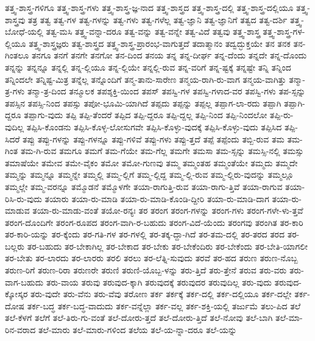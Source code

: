 {ತತ್ತ್ವ-ಶಾಸ್ತ್ರ-ಗಳಿಗೂ
ತತ್ತ್ವ-ಶಾಸ್ತ್ರ-ಗಳು
ತತ್ತ್ವ-ಶಾಸ್ತ್ರ-ಜ್ಞ-ನಾದ
ತತ್ತ್ವ-ಶಾಸ್ತ್ರದ
ತತ್ತ್ವ-ಶಾಸ್ತ್ರ-ದಲ್ಲಿ
ತತ್ತ್ವ-ಶಾಸ್ತ್ರ-ದಲ್ಲಿಯೂ
ತತ್ತ್ವ-ಶಾಸ್ತ್ರವು
ತತ್ರ
ತತ್ವ
ತತ್ವ-ಗಳ
ತತ್ವ-ಗಳನ್ನು
ತತ್ವ-ಗಳು
ತತ್ವ-ಗಳೆಲ್ಲ
ತತ್ವ-ಜ್ಞಾನಿ
ತತ್ವ-ಜ್ಞಾನಿಗೆ
ತತ್ವದ
ತತ್ವ-ದರ್ಶಿ
ತತ್ತ್ವ-ಬೋಧೆ-ಯಲ್ಲಿ
ತತ್ವ-ಮಸಿ
ತತ್ತ್ವ-ವನ್ನಾ-ದರೂ
ತತ್ವ-ವನ್ನು
ತತ್ವ-ವನ್ನೇ
ತತ್ವ-ವಿದೆ
ತತ್ವವು
ತತ್ತ್ವ-ಶಾಸ್ತ್ರ
ತತ್ತ್ವ-ಶಾಸ್ತ್ರ-ಗಳ-ಲ್ಲಿಯೂ
ತತ್ತ್ವ-ಶಾಸ್ತ್ರಜ್ಞರು
ತತ್ವ-ಶಾಸ್ತ್ರದ
ತತ್ತ್ವ-ಶಾಸ್ತ್ರ-ಪ್ರಾರಂಭ-ವಾಗುತ್ತದೆ
ತದಾತ್ಮಾನಂ
ತದ್ವದ್ಭುಕ್ತಯೇ
ತನ
ತನಕ
ತನ-ಗಿಂತಲೂ
ತನಗೂ
ತನಗೆ
ತನಗೇ
ತನಗೋ
ತನ-ದಿಂದ
ತನಯ
ತನ್ನ
ತನ್ನ-ದೀರ್ಘ
ತನ್ನ-ದೆಂದು
ತನ್ನದೇ
ತನ್ನ-ದೊಂದು
ತನ್ನನ್ನು
ತನ್ನನ್ನೂ
ತನ್ನಲ್ಲಿ
ತನ್ನ-ಲ್ಲಿಯೂ
ತನ್ನ-ಲ್ಲಿಯೇ
ತನ್ನಲ್ಲಿ-ರುವ
ತನ್ನ-ವರಿಗೆ
ತನ್ನ-ಷ್ಟಕ್ಕೆ
ತನ್ನಷ್ಟೇ
ತನ್ನಿ
ತನ್ನಿಂದ
ತನ್ನಿಂದಲೇ
ತನ್ನಿಷ್ಟ-ಮಿತ್ರ
ತನ್ನೆಲ್ಲ
ತನ್ನೊಂದಿಗೆ
ತನ್ಮ-ತಾನು-ಸಾರೇಣ
ತನ್ಮಯ-ರಾಗಿ-ರು-ವಾಗ
ತನ್ಮಯ-ವಾಗಿತ್ತು
ತನ್ಮಾ-ತ್ರ-ಗಳು
ತನ್ಮಾ-ತ್ರ-ದಿಂದ
ತನ್ಮೂಲಕ
ತಪಶ್ಶಕ್ತಿ-ಯಿಂದ
ತಪಸ್
ತಪಸ್ವಿ-ಗಳ
ತಪಸ್ವಿ-ಗಳಾದ-ವರ
ತಪಸ್ವಿ-ಗಳು
ತಪ-ಸ್ಸನ್ನು
ತಪಸ್ಸಿನ
ತಪಸ್ಸಿ-ನಿಂದ
ತಪಸ್ಸು
ತಪೋ-ಭೂಮಿ-ಯಾಗಿದೆ
ತಪ್ಪದು
ತಪ್ಪನ್ನು
ತಪ್ಪಲ್ಲ
ತಪ್ಪಾಗ-ಲಾ-ರದು
ತಪ್ಪಾಗಿ
ತಪ್ಪಾಗಿ-ದ್ದರೂ
ತಪ್ಪಾಗು-ವುದು
ತಪ್ಪಿ
ತಪ್ಪಿ-ತೆಂದರೆ
ತಪ್ಪಿದ
ತಪ್ಪಿ-ದ್ದರೂ
ತಪ್ಪಿ-ದ್ದಲ್ಲ
ತಪ್ಪಿ-ನಿಂದ
ತಪ್ಪಿ-ನಿಂದಲೋ
ತಪ್ಪಿ-ರು-ವುದಿಲ್ಲ
ತಪ್ಪಿಸಿ-ಕೊಂಡನು
ತಪ್ಪಿಸಿ-ಕೊಳ್ಳ-ಲೋಸುಗವೇ
ತಪ್ಪಿಸಿ-ಕೊಳ್ಳು-ವುದಕ್ಕೆ
ತಪ್ಪಿಸಿ-ಕೊಳ್ಳು-ವುದು
ತಪ್ಪಿಸಿದ
ತಪ್ಪಿ-ಸಿದರೆ
ತಪ್ಪು
ತಪ್ಪು-ಗಳನ್ನು
ತಪ್ಪು-ಗಳನ್ನೂ
ತಪ್ಪು-ಗಳಿವೆ
ತಪ್ಪು-ಗಳು
ತಪ್ಪು-ತ್ತದೆ
ತಪ್ಪೆ
ತಪ್ಪೆಂದು
ತಬ್ಬಿ-ರುವ
ತಮ
ತಮ-ಗಿಂತ
ತಮ-ಗಿ-ರುವ
ತಮಗೂ
ತಮಗೆ
ತಮ-ಗೆಯೇ
ತಮ-ಗೆಲ್ಲ
ತಮಗೇ
ತಮಸಾ
ತಮ-ಸ್ಸನ್ನು
ತಮಸ್ಸಿ-ನಲ್ಲಿ
ತಮಸ್ಸು
ತಮಾಷೆಯೇ
ತಮೇವ
ತಮೇ-ವೈಕಂ
ತಮೋ
ತಮೋ-ಗುಣವು
ತಮ್ಮ
ತಮ್ಮಂತಹ
ತಮ್ಮಂತೆಯೇ
ತಮ್ಮದು
ತಮ್ಮದೇ
ತಮ್ಮನ್ನು
ತಮ್ಮನ್ನೂ
ತಮ್ಮನ್ನೇ
ತಮ್ಮಲ್ಲಿ
ತಮ್ಮ-ಲ್ಲಿಗೆ
ತಮ್ಮ-ಲ್ಲಿದ್ದ
ತಮ್ಮ-ಲ್ಲಿ-ರುವ
ತಮ್ಮ-ಲ್ಲಿರು-ವುದನ್ನು
ತಮ್ಮಲ್ಲೂ
ತಮ್ಮಲ್ಲೇ
ತಮ್ಮ-ವರನ್ನೂ
ತಮ್ಮೊಡನೆ
ತಮ್ಮೊಳಗೇ
ತಯಾ-ರಾಗುತ್ತಿ-ರುವ
ತಯಾ-ರಾಗು-ತ್ತಿವೆ
ತಯಾ-ರಾಗುವ
ತಯಾ-ರಿಸಿ-ರು-ವುದು
ತಯಾರು
ತಯಾ-ರು-ಮಾಡಿ
ತಯಾ-ರು-ಮಾಡಿ-ಕೊಂಡಿ-ದ್ದೀರಿ
ತಯಾ-ರು-ಮಾಡಿ-ದಾಗ
ತಯಾ-ರು-ಮಾಡುವ
ತಯಾ-ರು-ಮಾಡು-ವಂತೆ
ತಯೋ-ರನ್ಯಃ
ತರ
ತರಂಗ
ತರಂಗ-ಗಳನ್ನು
ತರಂಗ-ಗಳು
ತರಂಗ-ಗಳೇ-ಳು-ತ್ತವೆ
ತರಂಗ-ದೊಂದಿಗೇ
ತರಂಗ-ರೂಪದ
ತರಂಗ-ವಾಗಿ-ರ-ಬಹುದು
ತರಂಗ-ವಿದೆ-ಯೆಂದು
ತರಂಗವು
ತರಂಗಿತ
ತರ-ಕಾರಿ
ತರ-ಕಾರಿ-ಯನ್ನು
ತರ-ಕ್ಕೆಂದು
ತರ-ಗತಿ-ಗಳ
ತರ-ಗಳಲ್ಲಿ
ತರ-ತಕ್ಕ-ದ್ದಾ-ಗಿದೆ
ತರ-ತಮ-ದಲ್ಲಿ
ತರ-ತರದ
ತರದ
ತರ-ಬಲ್ಲರು
ತರ-ಬಹುದು
ತರ-ಬೇಕಾಗಿಲ್ಲ
ತರ-ಬೇಕಾದ
ತರ-ಬೇಕು
ತರ-ಬೇಕೆಂದಿರು
ತರ-ಬೇಕೆಂದು
ತರ-ಬೇತಿ-ಯಾಗಲೀ
ತರ-ಬೇತು
ತರ-ಲಾರದು
ತರ-ಲಾರರು
ತರಲಿ
ತರಲು
ತರ-ಲೆತ್ನಿ-ಸುವುದು
ತರವೆ
ತರ-ಹದ
ತರುಣ
ತರುಣ-ನೊಬ್ಬ
ತರುಣ-ರಿಗೆ
ತರುಣ-ರಿರಾ
ತರುಣರೇ
ತರುಣಿ
ತರುಣಿ-ಯೊಬ್ಬ-ಳನ್ನು
ತರು-ತ್ತಿದೆ
ತರು-ತ್ತೇನೆ
ತರುವ
ತರು-ವರು
ತರು-ವಾಗ-ಬಹುದು
ತರು-ವಾಯ
ತರುವು
ತರುವುದ-ಕ್ಕಾಗಿ
ತರುವುದಕ್ಕೆ
ತರುವುದರ
ತರುವುದಿಲ್ಲ
ತರು-ವುದು
ತರುವುದ-ಕ್ಕೋಸ್ಕರ
ತರು-ವುದೇ
ತರು-ವೆನು
ತರು-ವೆವು
ತರೋಣ
ತರ್ಕ
ತರ್ಕಕ್ಕೆ
ತರ್ಕ-ದಲ್ಲಿ
ತರ್ಕ-ದಲ್ಲಿಯೂ
ತರ್ಕ-ದಲ್ಲೇ
ತರ್ಕ-ದೋಷ
ತರ್ಕ-ಬದ್ಧ
ತರ್ಕ-ಬದ್ಧ-ವಾದುದು
ತರ್ಕ-ವನ್ನೆಲ್ಲಾ
ತರ್ಕ-ವಲ್ಲ
ತರ್ಕ-ಶಕ್ತಿ-ಯಲ್ಲಿ
ತರ್ಜುಮೆ
ತಲು-ಪಿದ
ತಲೆ
ತಲೆ-ಕೆಳಗೆ
ತಲೆಗೆ
ತಲೆ-ತಿರು-ಗು-ವಂತೆ
ತಲೆ-ದೋರು-ತ್ತದೆ
ತಲೆ-ದೋರು-ತ್ತಿದೆ
ತಲೆ-ನೋವು
ತಲೆ-ಬಾಗಿ
ತಲೆ-ಮಾ-ರಿನ-ವರಾದ
ತಲೆ-ಮಾರು
ತಲೆ-ಮಾರು-ಗಳಿಂದ
ತಲೆಯ
ತಲೆ-ಯ-ನ್ನಾ-ದರೂ
ತಲೆ-ಯನ್ನು
}
